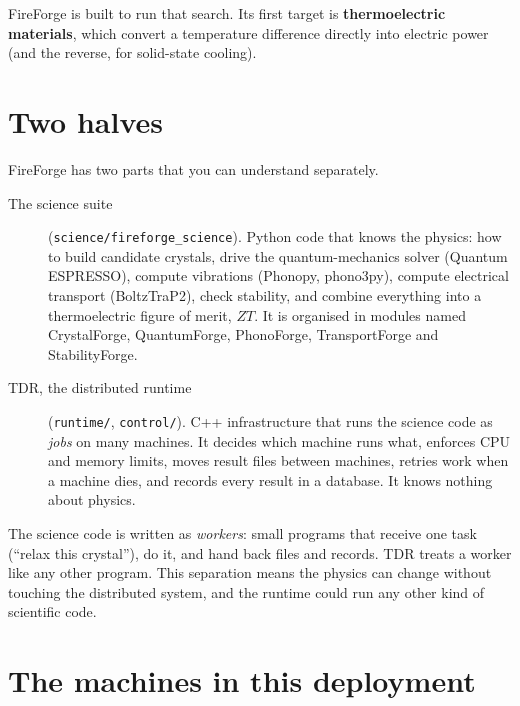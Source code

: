 \documentclass[11pt,a4paper]{report}
\newcommand{\code}[1]{\texttt{#1}}
\begin{document}
FireForge is built to run that search. Its first target is \textbf{thermoelectric
materials}, which convert a temperature difference directly into electric power (and the
reverse, for solid-state cooling).

\section{Two halves}

FireForge has two parts that you can understand separately.

\begin{description}
\item[The science suite] (\code{science/fireforge\_science}). Python code that knows the
  physics: how to build candidate crystals, drive the quantum-mechanics solver (Quantum
  ESPRESSO), compute vibrations (Phonopy, phono3py), compute electrical transport
  (BoltzTraP2), check stability, and combine everything into a thermoelectric figure of
  merit, $ZT$. It is organised in modules named CrystalForge, QuantumForge, PhonoForge,
  TransportForge and StabilityForge.
\item[TDR, the distributed runtime] (\code{runtime/}, \code{control/}). C++ infrastructure
  that runs the science code as \emph{jobs} on many machines. It decides which machine runs
  what, enforces CPU and memory limits, moves result files between machines, retries work
  when a machine dies, and records every result in a database. It knows nothing about
  physics.
\end{description}

The science code is written as \emph{workers}: small programs that receive one task
(``relax this crystal''), do it, and hand back files and records. TDR treats a worker like
any other program. This separation means the physics can change without touching the
distributed system, and the runtime could run any other kind of scientific code.

\section{The machines in this deployment}
\end{document}
